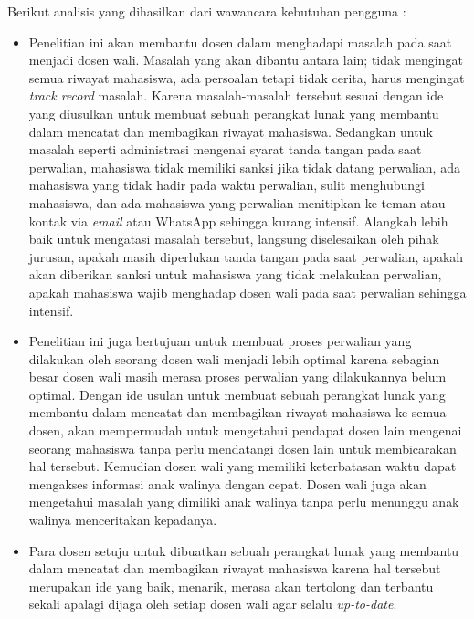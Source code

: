 Berikut analisis yang dihasilkan dari wawancara kebutuhan pengguna :
\begin{itemize}
\item Penelitian ini akan membantu dosen dalam menghadapi masalah pada saat menjadi dosen wali. Masalah yang akan dibantu antara lain; tidak mengingat semua riwayat mahasiswa, ada persoalan tetapi tidak cerita, harus mengingat {\it track record} masalah. Karena masalah-masalah tersebut sesuai dengan ide yang diusulkan untuk membuat sebuah perangkat lunak yang membantu dalam mencatat dan membagikan riwayat mahasiswa. Sedangkan untuk masalah seperti administrasi mengenai syarat tanda tangan pada saat perwalian, mahasiswa tidak memiliki sanksi jika tidak datang perwalian, ada mahasiswa yang tidak hadir pada waktu perwalian, sulit menghubungi mahasiswa, dan ada mahasiswa yang perwalian menitipkan ke teman atau kontak via {\it email} atau WhatsApp sehingga kurang intensif. Alangkah lebih baik untuk mengatasi masalah tersebut, langsung diselesaikan oleh pihak jurusan, apakah masih diperlukan tanda tangan pada saat perwalian, apakah akan diberikan sanksi untuk mahasiswa yang tidak melakukan perwalian, apakah mahasiswa wajib menghadap dosen wali pada saat perwalian sehingga intensif.
\item Penelitian ini juga bertujuan untuk membuat proses perwalian yang dilakukan oleh seorang dosen wali menjadi lebih optimal karena sebagian besar dosen wali masih merasa proses perwalian yang dilakukannya belum optimal. Dengan ide usulan untuk membuat sebuah perangkat lunak yang membantu dalam mencatat dan membagikan riwayat mahasiswa ke semua dosen, akan mempermudah untuk mengetahui pendapat dosen lain mengenai seorang mahasiswa tanpa perlu mendatangi dosen lain untuk membicarakan hal tersebut. Kemudian dosen wali yang memiliki keterbatasan waktu dapat mengakses informasi anak walinya dengan cepat. Dosen wali juga akan mengetahui masalah yang dimiliki anak walinya tanpa perlu menunggu anak walinya menceritakan kepadanya.
\item Para dosen setuju untuk dibuatkan sebuah perangkat lunak yang membantu dalam mencatat dan membagikan riwayat mahasiswa karena hal tersebut merupakan ide yang baik, menarik, merasa akan tertolong dan terbantu sekali apalagi dijaga oleh setiap dosen wali agar selalu {\it up-to-date}.

\end{itemize}
